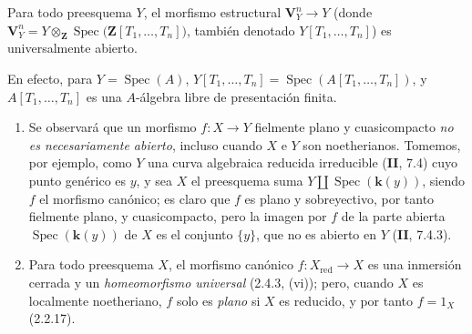 \begin{corollary}[2.4.7]
\label{IV.2.4.7-fr}
Para todo preesquema $Y$, el morfismo estructural $\mathbf V_Y^n\to Y$ \textup{(donde}
$\mathbf V_Y^n
=Y\otimes_{\mathbf Z}\operatorname{Spec}
  \bigl(\mathbf Z[T_1,\ldots,T_n]\bigr)$,
\textup{también denotado $Y[T_1,\ldots,T_n]$)} es universalmente abierto.
\end{corollary}

En efecto, para $Y=\operatorname{Spec}(A)$,
$Y[T_1,\ldots,T_n]=\operatorname{Spec}(A[T_1,\ldots,T_n])$, y
$A[T_1,\ldots,T_n]$ es una $A$-álgebra libre de presentación finita.

\begin{remarks}[2.4.8]
\label{IV.2.4.8-fr}
\begin{enumerate}
\item[(i)] Se observará que un morfismo $f:X\to Y$ fielmente plano y
cuasicompacto \emph{no es necesariamente abierto}, incluso cuando $X$ e $Y$
son noetherianos. Tomemos, por ejemplo, como $Y$ una curva algebraica reducida
irreducible (\textbf{II}, 7.4) cuyo punto genérico es $y$, y sea $X$ el preesquema suma
$Y\amalg\operatorname{Spec}(\boldsymbol{k}(y))$, siendo $f$ el morfismo canónico; es claro
que $f$ es plano y sobreyectivo, por tanto fielmente plano, y cuasicompacto,
pero la imagen por $f$ de la parte abierta $\operatorname{Spec}(\boldsymbol{k}(y))$ de $X$
es el conjunto $\{y\}$, que no es abierto en $Y$ (\textbf{II}, 7.4.3).
\item[(ii)] Para todo preesquema $X$, el morfismo canónico
$f:X_{\mathrm{red}}\to X$ es una inmersión cerrada y un
\emph{homeomorfismo universal} (2.4.3, (vi)); pero, cuando $X$ es localmente
noetheriano, $f$ solo es \emph{plano} si $X$ es reducido, y por tanto
$f=1_X$ (2.2.17).
\end{enumerate}
\end{remarks}
